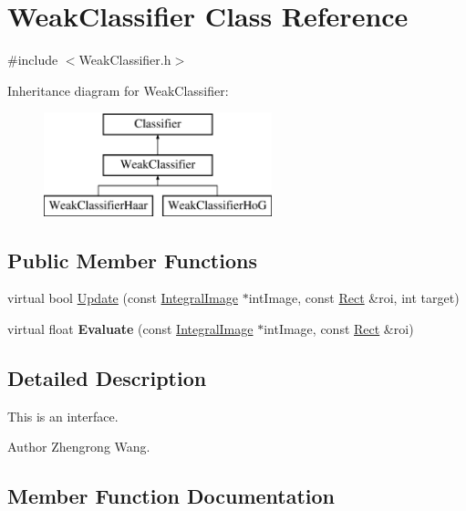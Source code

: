 \hypertarget{classWeakClassifier}{}\section{Weak\+Classifier Class Reference}
\label{classWeakClassifier}


{\ttfamily \#include $<$Weak\+Classifier.\+h$>$}

Inheritance diagram for Weak\+Classifier\+:\begin{figure}[H]
\begin{center}
\leavevmode
\includegraphics[height=3.000000cm]{classWeakClassifier}
\end{center}
\end{figure}
\subsection*{Public Member Functions}
\begin{DoxyCompactItemize}
\item 
virtual bool \hyperlink{classWeakClassifier_ad4c967e2f0d186a841722f8fea9dbd9c}{Update} (const \hyperlink{classIntegralImage}{Integral\+Image} $\ast$int\+Image, const \hyperlink{classRect}{Rect} \&roi, int target)
\item 
\hypertarget{classWeakClassifier_a083dddaa52fe399386f07a20f231ec49}{}virtual float {\bfseries Evaluate} (const \hyperlink{classIntegralImage}{Integral\+Image} $\ast$int\+Image, const \hyperlink{classRect}{Rect} \&roi)\label{classWeakClassifier_a083dddaa52fe399386f07a20f231ec49}

\end{DoxyCompactItemize}


\subsection{Detailed Description}
This is an interface. \begin{DoxyAuthor}{Author}
Zhengrong Wang. 
\end{DoxyAuthor}


\subsection{Member Function Documentation}
\hypertarget{classWeakClassifier_ad4c967e2f0d186a841722f8fea9dbd9c}{}
